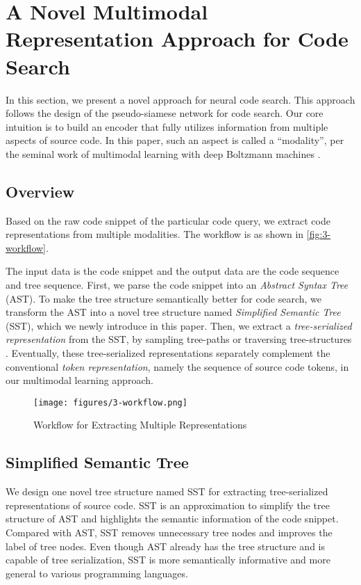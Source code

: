 \documentclass[conference]{IEEEtran}
\begin{document}
 \section{A Novel Multimodal Representation Approach for Code Search}
\label{sec:approach}

In this section, we present a novel approach for neural code search. This approach follows the design of the pseudo-siamese network for code search.
Our core intuition is to build an encoder that fully utilizes information from multiple aspects of source code. In this paper, such an aspect is called a ``modality'', per the seminal work of multimodal learning with deep Boltzmann machines \cite{Srivastava2012MultimodalLW}.
\subsection{Overview}

Based on the raw code snippet of the particular code query, we extract code representations from multiple modalities. The workflow is as shown in \autoref{fig:3-workflow}.

The input data is the code snippet and the output data are the code sequence and tree sequence. First, we parse the code snippet into an \emph{Abstract Syntax Tree} (AST). To make the tree structure semantically better for code search, we transform the AST into a novel tree structure named \emph{Simplified Semantic Tree} (SST), which we newly introduce in this paper. Then, we extract a \emph{tree-serialized representation} from the SST, by sampling tree-paths \cite{Alon2018AGP,Kim2020CodePB} or traversing tree-structures \cite{Hu2018DeepCC,Chen2018TreetotreeNN}. Eventually, these tree-serialized representations separately complement the conventional \emph{token representation}, namely the sequence of source code tokens, in our multimodal learning approach.

\begin{figure}[!htb]
  \centering
  \texttt{[image: figures/3-workflow.png]}
  \caption{Workflow for Extracting Multiple Representations}
  \label{fig:3-workflow}
\end{figure}

\subsection{Simplified Semantic Tree}
We design one novel tree structure named SST for extracting tree-serialized representations of source code. SST is an approximation to simplify the tree structure of AST and highlights the semantic information of the code snippet. Compared with AST, SST removes unnecessary tree nodes and improves the label of tree nodes. Even though AST already has the tree structure and is capable of tree serialization, SST is more semantically informative and more general to various programming languages.
\end{document}
